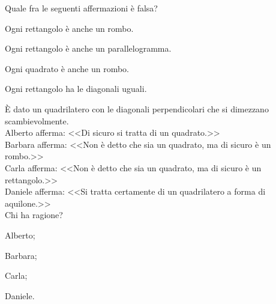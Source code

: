 \begin{esercizio}
\label{ese:4.67}
Quale fra le seguenti affermazioni è falsa?
\begin{enumeratea}
\item Ogni rettangolo è anche un rombo.
\item Ogni rettangolo è anche un parallelogramma.
\item Ogni quadrato è anche un rombo.
\item Ogni rettangolo ha le diagonali uguali.
\end{enumeratea}
\end{esercizio}

\begin{esercizio}
\label{ese:4.68}
\`E dato un quadrilatero con le diagonali perpendicolari che si dimezzano scambievolmente.\\
Alberto afferma: <<Di sicuro si tratta di un quadrato.>>\\
Barbara afferma: <<Non è detto che sia un quadrato, ma di sicuro è un rombo.>>\\
Carla afferma: <<Non è detto che sia un quadrato, ma di sicuro è un rettangolo.>>\\
Daniele afferma: <<Si tratta certamente di un quadrilatero a forma di aquilone.>>\\
Chi ha ragione?
\begin{multicols}{4}
\begin{enumeratea}
\item Alberto;
\item Barbara;
\item Carla;
\item Daniele.
\end{enumeratea}
\end{multicols}
\end{esercizio}
